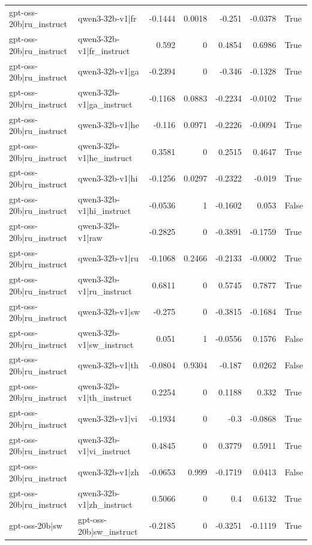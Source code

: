 \begin{table}
\begin{tabular}{l l r r r r l}
gpt-oss-20b|ru_instruct & qwen3-32b-v1|fr & -0.1444 & 0.0018 & -0.251 & -0.0378 & True \\
gpt-oss-20b|ru_instruct & qwen3-32b-v1|fr_instruct & 0.592 & 0 & 0.4854 & 0.6986 & True \\
gpt-oss-20b|ru_instruct & qwen3-32b-v1|ga & -0.2394 & 0 & -0.346 & -0.1328 & True \\
gpt-oss-20b|ru_instruct & qwen3-32b-v1|ga_instruct & -0.1168 & 0.0883 & -0.2234 & -0.0102 & True \\
gpt-oss-20b|ru_instruct & qwen3-32b-v1|he & -0.116 & 0.0971 & -0.2226 & -0.0094 & True \\
gpt-oss-20b|ru_instruct & qwen3-32b-v1|he_instruct & 0.3581 & 0 & 0.2515 & 0.4647 & True \\
gpt-oss-20b|ru_instruct & qwen3-32b-v1|hi & -0.1256 & 0.0297 & -0.2322 & -0.019 & True \\
gpt-oss-20b|ru_instruct & qwen3-32b-v1|hi_instruct & -0.0536 & 1 & -0.1602 & 0.053 & False \\
gpt-oss-20b|ru_instruct & qwen3-32b-v1|raw & -0.2825 & 0 & -0.3891 & -0.1759 & True \\
gpt-oss-20b|ru_instruct & qwen3-32b-v1|ru & -0.1068 & 0.2466 & -0.2133 & -0.0002 & True \\
gpt-oss-20b|ru_instruct & qwen3-32b-v1|ru_instruct & 0.6811 & 0 & 0.5745 & 0.7877 & True \\
gpt-oss-20b|ru_instruct & qwen3-32b-v1|sw & -0.275 & 0 & -0.3815 & -0.1684 & True \\
gpt-oss-20b|ru_instruct & qwen3-32b-v1|sw_instruct & 0.051 & 1 & -0.0556 & 0.1576 & False \\
gpt-oss-20b|ru_instruct & qwen3-32b-v1|th & -0.0804 & 0.9304 & -0.187 & 0.0262 & False \\
gpt-oss-20b|ru_instruct & qwen3-32b-v1|th_instruct & 0.2254 & 0 & 0.1188 & 0.332 & True \\
gpt-oss-20b|ru_instruct & qwen3-32b-v1|vi & -0.1934 & 0 & -0.3 & -0.0868 & True \\
gpt-oss-20b|ru_instruct & qwen3-32b-v1|vi_instruct & 0.4845 & 0 & 0.3779 & 0.5911 & True \\
gpt-oss-20b|ru_instruct & qwen3-32b-v1|zh & -0.0653 & 0.999 & -0.1719 & 0.0413 & False \\
gpt-oss-20b|ru_instruct & qwen3-32b-v1|zh_instruct & 0.5066 & 0 & 0.4 & 0.6132 & True \\
gpt-oss-20b|sw & gpt-oss-20b|sw_instruct & -0.2185 & 0 & -0.3251 & -0.1119 & True \\

\end{tabular}
\end{table}
